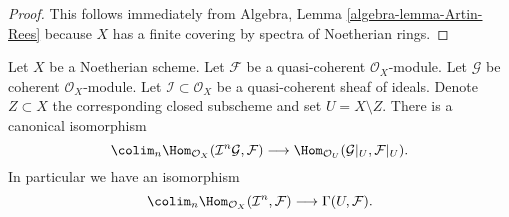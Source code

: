\begin{proof}
This follows immediately from
Algebra, Lemma \ref{algebra-lemma-Artin-Rees}
because $X$ has a finite covering by spectra of Noetherian rings.
\end{proof}

\begin{lemma}
\label{lemma-homs-over-open}
Let $X$ be a Noetherian scheme.
Let $\mathcal{F}$ be a quasi-coherent $\mathcal{O}_X$-module.
Let $\mathcal{G}$ be coherent $\mathcal{O}_X$-module.
Let $\mathcal{I} \subset \mathcal{O}_X$ be a quasi-coherent sheaf of
ideals. Denote $Z \subset X$ the corresponding closed subscheme and
set $U = X \setminus Z$.
There is a canonical isomorphism
$$
\colim_n \Hom_{\mathcal{O}_X}(\mathcal{I}^n\mathcal{G}, \mathcal{F})
\longrightarrow
\Hom_{\mathcal{O}_U}(\mathcal{G}|_U, \mathcal{F}|_U).
$$
In particular we have an isomorphism
$$
\colim_n \Hom_{\mathcal{O}_X}(
\mathcal{I}^n, \mathcal{F})
\longrightarrow
\Gamma(U, \mathcal{F}).
$$
\end{lemma}

